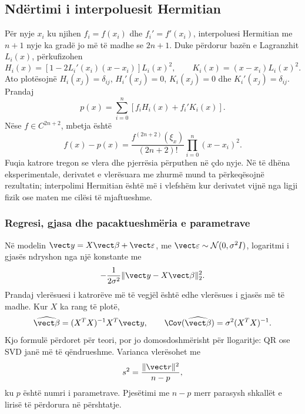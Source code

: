 \subsection{Ndërtimi i interpoluesit Hermitian}
Për nyje $x_i$ ku njihen $f_i=f(x_i)$ dhe $f_i'=f'(x_i)$, interpoluesi Hermitian me $n+1$ nyje ka gradë jo më të madhe se $2n+1$. Duke përdorur bazën e Lagranzhit $L_i(x)$, përkufizohen
\begin{equation}
 H_i(x)=\left[1-2L_i'(x_i)(x-x_i)\right]L_i(x)^2,
 \qquad
 K_i(x)=(x-x_i)L_i(x)^2.
\end{equation}
Ato plotësojnë $H_i(x_j)=\delta_{ij}$, $H_i'(x_j)=0$, $K_i(x_j)=0$ dhe $K_i'(x_j)=\delta_{ij}$. Prandaj
\begin{equation}
 p(x)=\sum_{i=0}^{n}\left[f_iH_i(x)+f_i'K_i(x)\right].
\end{equation}
Nëse $f\in C^{2n+2}$, mbetja është
\begin{equation}
 f(x)-p(x)=\frac{f^{(2n+2)}(\xi_x)}{(2n+2)!}
 \prod_{i=0}^{n}(x-x_i)^2.
\end{equation}
Fuqia katrore tregon se vlera dhe pjerrësia përputhen në çdo nyje. Në të dhëna eksperimentale, derivatet e vlerësuara me zhurmë mund ta përkeqësojnë rezultatin; interpolimi Hermitian është më i vlefshëm kur derivatet vijnë nga ligji fizik ose maten me cilësi të mjaftueshme.

\subsubsection{Regresi, gjasa dhe pacaktueshmëria e parametrave}
Në modelin $\vect y=X\vect\beta+\vect\varepsilon$, me $\vect\varepsilon\sim\mathcal N(0,\sigma^2I)$, logaritmi i gjasës ndryshon nga një konstante me
\begin{equation}
 -\frac{1}{2\sigma^2}\|\vect y-X\vect\beta\|_2^2.
\end{equation}
Prandaj vlerësuesi i katrorëve më të vegjël është edhe vlerësues i gjasës më të madhe. Kur $X$ ka rang të plotë,
\begin{equation}
 \widehat{\vect\beta}=(X^TX)^{-1}X^T\vect y,
 \qquad
 \Cov(\widehat{\vect\beta})=\sigma^2(X^TX)^{-1}.
\end{equation}
Kjo formulë përdoret për teori, por jo domosdoshmërisht për llogaritje: QR ose SVD janë më të qëndrueshme. Varianca vlerësohet me
\begin{equation}
 s^2=\frac{\|\vect r\|^2}{n-p},
\end{equation}
ku $p$ është numri i parametrave. Pjesëtimi me $n-p$ merr parasysh shkallët e lirisë të përdorura në përshtatje.

